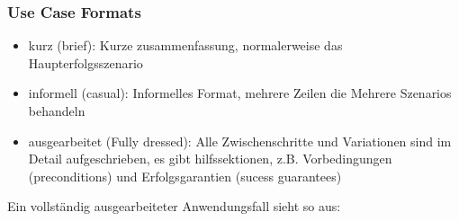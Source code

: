 \documentclass[ngerman,color=3b]{tuda_summary}
\begin{document}
\subsubsection{Use Case Formats}
\begin{itemize}
    \item kurz (brief): Kurze zusammenfassung, normalerweise das Haupterfolgsszenario
    \item informell (casual): Informelles Format, mehrere Zeilen die Mehrere Szenarios behandeln
    \item ausgearbeitet (Fully dressed): Alle Zwischenschritte und Variationen sind im Detail aufgeschrieben, es gibt hilfssektionen, z.B. Vorbedingungen (preconditions) und Erfolgsgarantien (sucess guarantees)
\end{itemize}
Ein vollständig ausgearbeiteter Anwendungsfall sieht so aus:
\end{document}
